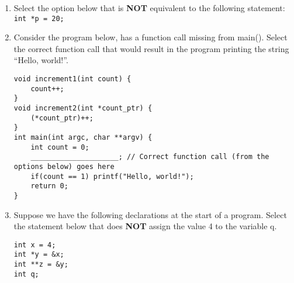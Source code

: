 \documentclass[11pt]{article}
\begin{document}
\begin{enumerate}[{1}.1]
	\item Select the option below that is \textbf{NOT} equivalent to the following statement: \Verb|int *p = 20;|

	\item Consider the program below, has a function call missing from main(). Select the correct function call that would result in the program printing the string “Hello, world!”.
\begin{Verbatim}
void increment1(int count) {
	count++;
}
void increment2(int *count_ptr) {
	(*count_ptr)++;
}
int main(int argc, char **argv) {
	int count = 0;
	_____________________; // Correct function call (from the options below) goes here
	if(count == 1) printf("Hello, world!");
	return 0;
}
\end{Verbatim}

	\item Suppose we have the following declarations at the start of a program. Select the statement
	below that does \textbf{NOT} assign the value 4 to the variable q.
\begin{Verbatim}
int x = 4;
int *y = &x;
int **z = &y;
int q;
\end{Verbatim}


\end{enumerate}
\end{document}
